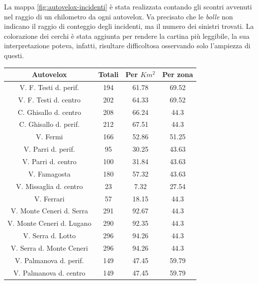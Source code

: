 \documentclass[a4paper,12pt]{report}
\newcommand{\quotestyle}[1]{\textit{#1}}
\begin{document}
La mappa \ref{fig:autovelox-incidenti} è stata realizzata contando gli scontri avvenuti 
nel raggio di un chilometro da ogni autovelox. 
Va precisato che le \quotestyle{bolle} non indicano il raggio di conteggio degli incidenti, ma 
il numero dei sinistri trovati. 
La colorazione dei cerchi è stata aggiunta per 
rendere la cartina più leggibile, la sua interpretazione poteva, infatti, risultare 
difficoltosa osservando solo l'ampiezza di questi. 

\begin{center}
    \def\arraystretch{1.5}%
    \begin{tabular}{ |c|c|c|c| }
        \hline
        Autovelox & Totali & Per $Km^2$ & Per zona \\ 
        \hline
        \rowcolor{TableGray}
        V. F. Testi d. perif.\footnotemark[1]   &   194 &   61.78   &   69.52 \\
        V. F. Testi d. centro                   &   202 &   64.33   &   69.52 \\
        \rowcolor{TableGray}
        C. Ghisallo d. centro\footnotemark[2]   &   208 &   66.24   &   44.3 \\
        C. Ghisallo d. perif.                   &   212 &   67.51   &   44.3 \\
        \rowcolor{TableGray}
        V. Fermi                                &   166 &   52.86   &   51.25 \\
        V. Parri d. perif.                      &    95 &   30.25   &   43.63 \\
        \rowcolor{TableGray}
        V. Parri d. centro                      &   100 &   31.84   &   43.63 \\
        V. Famagosta                            &   180 &   57.32   &   43.63 \\
        \rowcolor{TableGray}
        V. Missaglia d. centro                  &   23  &    7.32   &   27.54 \\
        V. Ferrari                              &   57  &   18.15   &   44.3 \\
        \rowcolor{TableGray}
        V. Monte Ceneri d. Serra                &   291 &   92.67   &   44.3 \\
        V. Monte Ceneri d. Lugano               &   290 &   92.35   &   44.3 \\
        \rowcolor{TableGray}
        V. Serra d. Lotto                       &   296 &   94.26   &   44.3 \\
        V. Serra d. Monte Ceneri                &   296 &   94.26   &   44.3 \\
        \rowcolor{TableGray}
        V. Palmanova d. perif.                  &   149 &   47.45   &   59.79 \\
        V. Palmanova d. centro                  &   149 &   47.45   &   59.79 \\
        \hline
    \end{tabular}
\end{center}
\end{document}
